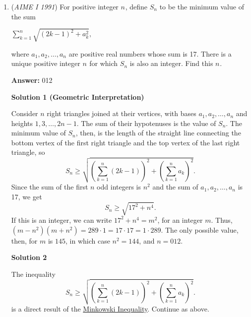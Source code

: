 \begin{enumerate}
 Rewriting the first equation,
 \[81y = z^2 - 81^2 = (z+81)(z-81).\]

 Because both \(y\) and \(z\) are integers, \(z\) must be a multiple of \(9\). Additionally, we observe that \(y > z\), so we test the smallest such value of \(z\) satisfying this condition, namely \(z = 135\). Substituting gives
 \[y = \frac{135^2 - 81^2}{81} = 144.\]

 Substituting \(y = 144\) into the second equation,
 \[x^2 = 31(144) + 81^2 = 11025,\]so \(x = 105\).

 Finally, summing the three diagonal lengths, \(105 + 135 + 144 = \boxed{384}.\)

 


	\item (\textit{AIME I 1991}) For positive integer $n_{}^{}$, define $S_n^{}$ to be the minimum value of the sum


 $\sum_{k=1}^n \sqrt{(2k-1)^2+a_k^2},$

 where $a_1,a_2,\ldots,a_n^{}$ are positive real numbers whose sum is 17. There is a unique positive integer $n^{}_{}$ for which $S_n^{}$ is also an integer. Find this $n^{}_{}$.


 
 \textbf{Answer: }012



\textbf{Solution 1 (Geometric Interpretation)}

Consider $n$ right triangles joined at their vertices, with bases $a_1,a_2,\ldots,a_n$ and heights $1,3,\ldots, 2n - 1$. The sum of their hypotenuses is the value of $S_n$. The minimum value of $S_n$, then, is the length of the straight line connecting the bottom vertex of the first right triangle and the top vertex of the last right triangle, so
 \[S_n \ge \sqrt {\left(\sum_{k = 1}^n (2k - 1)\right)^2 + \left(\sum_{k = 1}^n a_k\right)^2}.\]Since the sum of the first $n$ odd integers is $n^2$ and the sum of $a_1,a_2,\ldots,a_n$ is 17, we get
 \[S_n \ge \sqrt {17^2 + n^4}.\]If this is an integer, we can write $17^2 + n^4 = m^2$, for an integer $m$. Thus, $(m - n^2)(m + n^2) = 289\cdot 1 = 17\cdot 17 = 1\cdot 289.$ The only possible value, then, for $m$ is $145$, in which case $n^2 = 144$, and $n = \boxed {012}$.

 



\textbf{Solution 2}

The inequality 
 \[S_n \ge \sqrt {\left(\sum_{k = 1}^n (2k - 1)\right)^2 + \left(\sum_{k = 1}^n a_k\right)^2}.\]is a direct result of the \href{https://artofproblemsolving.com/wiki/index.php?title=Minkowski\_Inequality}{Minkowski Inequality}. Continue as above.


\end{enumerate}

